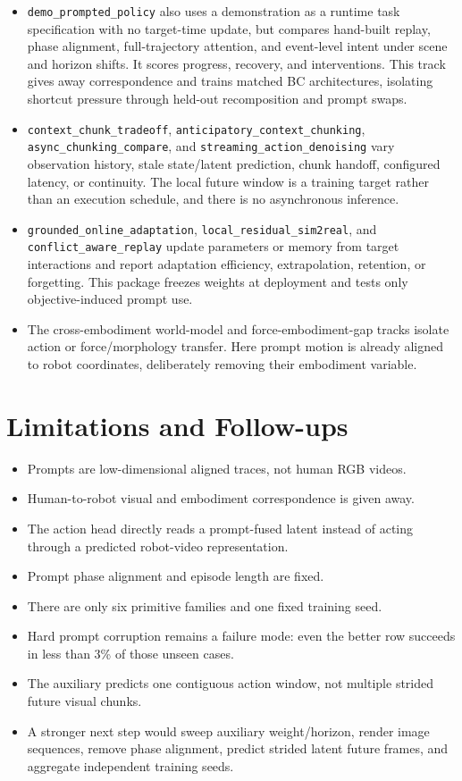 \documentclass[11pt]{article}
\begin{document}
\begin{itemize}[leftmargin=1.5em]
  \item \texttt{demo\_prompted\_policy} also uses a demonstration as a runtime task specification with no target-time update, but compares hand-built replay, phase alignment, full-trajectory attention, and event-level intent under scene and horizon shifts. It scores progress, recovery, and interventions. This track gives away correspondence and trains matched BC architectures, isolating shortcut pressure through held-out recomposition and prompt swaps.
  \item \texttt{context\_chunk\_tradeoff}, \texttt{anticipatory\_context\_chunking}, \texttt{async\_chunking\_compare}, and \texttt{streaming\_action\_denoising} vary observation history, stale state/latent prediction, chunk handoff, configured latency, or continuity. The local future window is a training target rather than an execution schedule, and there is no asynchronous inference.
  \item \texttt{grounded\_online\_adaptation}, \texttt{local\_residual\_sim2real}, and \texttt{conflict\_aware\_replay} update parameters or memory from target interactions and report adaptation efficiency, extrapolation, retention, or forgetting. This package freezes weights at deployment and tests only objective-induced prompt use.
  \item The cross-embodiment world-model and force-embodiment-gap tracks isolate action or force/morphology transfer. Here prompt motion is already aligned to robot coordinates, deliberately removing their embodiment variable.
\end{itemize}

\section{Limitations and Follow-ups}
\begin{itemize}[leftmargin=1.5em]
  \item Prompts are low-dimensional aligned traces, not human RGB videos.
  \item Human-to-robot visual and embodiment correspondence is given away.
  \item The action head directly reads a prompt-fused latent instead of acting through a predicted robot-video representation.
  \item Prompt phase alignment and episode length are fixed.
  \item There are only six primitive families and one fixed training seed.
  \item Hard prompt corruption remains a failure mode: even the better row succeeds in less than 3\% of those unseen cases.
  \item The auxiliary predicts one contiguous action window, not multiple strided future visual chunks.
  \item A stronger next step would sweep auxiliary weight/horizon, render image sequences, remove phase alignment, predict strided latent future frames, and aggregate independent training seeds.
\end{itemize}
\end{document}
